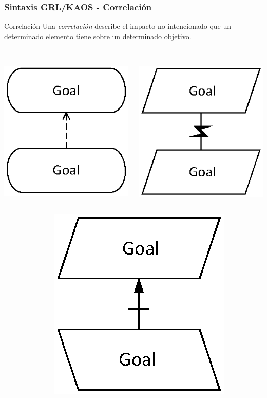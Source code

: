 \documentclass[slidestop,xcolor=pst,dvips,blue]{beamer}
\begin{document}
\begin{frame}[c]
    \frametitle{Sintaxis GRL/KAOS - Correlación}
    \begin{block}{Correlación}
        Una \alert{\emph{correlación}} describe el impacto no intencionado que un determinado elemento tiene sobre un determinado objetivo.
        \ \\
        \ \\
        \begin{columns}[c]
            \begin{column}{0.5\linewidth}
                \centering \includegraphics[width=0.35\columnwidth,keepaspectratio=true]{images/objetivos/correlation(GRL).eps}
            \end{column}
            \begin{column}{0.5\linewidth}
                \centering \includegraphics[width=0.35\columnwidth,keepaspectratio=true]{images/objetivos/contribution(KAOS).eps}
            \end{column}
        \end{columns}
        \begin{columns}[c]
            \begin{column}{0.50\linewidth}
            \end{column}
            \begin{column}{0.50\linewidth}
                \centering \includegraphics[width=0.35\columnwidth,keepaspectratio=true]{images/objetivos/contribution(2)(KAOS).eps}
            \end{column}
        \end{columns}
    \end{block}
\end{frame}
\end{document}
